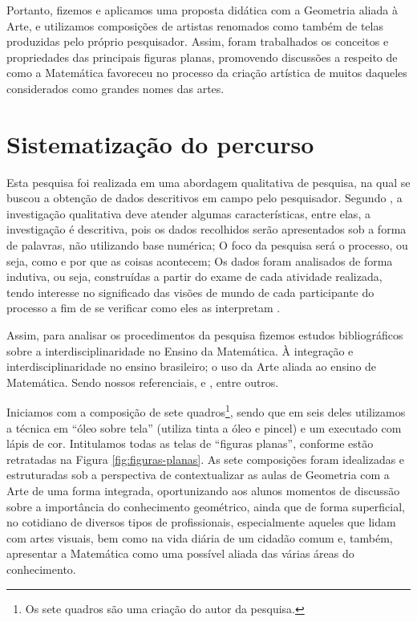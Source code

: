 \begin{refsection}
    Portanto, fizemos e aplicamos uma proposta didática com a Geometria aliada à Arte, e utilizamos composições de artistas renomados como também de telas produzidas pelo próprio pesquisador. Assim, foram trabalhados os conceitos e propriedades das principais figuras planas, promovendo discussões a respeito de como a Matemática favoreceu no processo da criação artística de muitos daqueles considerados como grandes nomes das artes. 

    \section{Sistematização do percurso}

    Esta pesquisa foi realizada em uma abordagem qualitativa de pesquisa, na qual se buscou a obtenção de dados descritivos em campo pelo pesquisador. Segundo \textcite{BOGDANAndBIKLEN1994Investigação}, a investigação qualitativa deve atender algumas características, entre elas, a investigação é descritiva, pois os dados recolhidos serão apresentados sob a forma de palavras, não utilizando base numérica; O foco da pesquisa será o processo, ou seja, como e por que as coisas acontecem; Os dados foram analisados de forma indutiva, ou seja, construídas a partir do exame de cada atividade realizada, tendo interesse no significado das visões de mundo de cada participante do processo a fim de se verificar como eles as interpretam \cite{BOGDANAndBIKLEN1994Investigação}. 

    Assim, para analisar os procedimentos da pesquisa fizemos estudos bibliográficos sobre a interdisciplinaridade no Ensino da Matemática. À integração e interdisciplinaridade no ensino brasileiro; o uso da Arte aliada ao ensino de Matemática. Sendo nossos referenciais, \textcite{FAZENDA2011Integração} e \textcite{ARAÚJO2008Ponto}, entre outros. 

    Iniciamos com a composição de sete quadros\footnote{Os sete quadros são uma criação do autor da pesquisa.}, sendo que em seis deles utilizamos a técnica em “óleo sobre tela” (utiliza tinta a óleo e pincel) e um executado com lápis de cor. Intitulamos todas as telas de “figuras planas”, conforme estão retratadas na Figura \ref{fig:figuras-planas}. As sete composições foram idealizadas e estruturadas sob a perspectiva de contextualizar as aulas de Geometria com a Arte de uma forma integrada, oportunizando aos alunos momentos de discussão sobre a importância do conhecimento geométrico, ainda que de forma superficial, no cotidiano de diversos tipos de profissionais, especialmente aqueles que lidam com artes visuais, bem como na vida diária de um cidadão comum e, também, apresentar a Matemática como uma possível aliada das várias áreas do conhecimento. 


\end{refsection}
